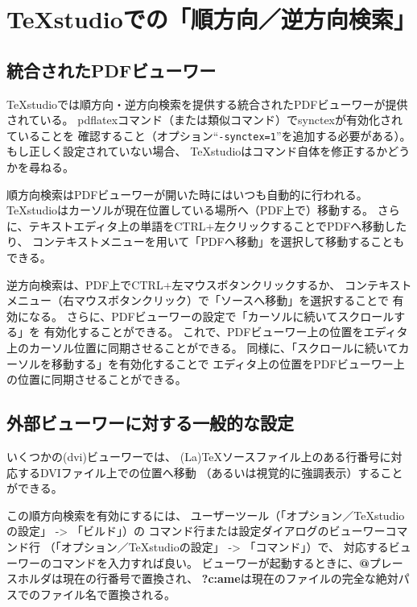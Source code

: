 \section{TeXstudioでの「順方向／逆方向検索」}\label{sec:search}

\subsection{統合されたPDFビューワー}

TeXstudioでは順方向・逆方向検索を提供する統合されたPDFビューワーが提供されている。
pdflatexコマンド（または類似コマンド）でsynctexが有効化されていることを
確認すること（オプション``\texttt{-synctex=1}''を追加する必要がある）。
もし正しく設定されていない場合、
TeXstudioはコマンド自体を修正するかどうかを尋ねる。

順方向検索はPDFビューワーが開いた時にはいつも自動的に行われる。
TeXstudioはカーソルが現在位置している場所へ（PDF上で）移動する。
さらに、テキストエディタ上の単語をCTRL+左クリックすることでPDFへ移動したり、
コンテキストメニューを用いて「PDFへ移動」を選択して移動することもできる。

逆方向検索は、PDF上でCTRL+左マウスボタンクリックするか、
コンテキストメニュー（右マウスボタンクリック）で「ソースへ移動」を選択することで
有効になる。
さらに、PDFビューワーの設定で「カーソルに続いてスクロールする」を
有効化することができる。
これで、PDFビューワー上の位置をエディタ上のカーソル位置に同期させることができる。
同様に、「スクロールに続いてカーソルを移動する」を有効化することで
エディタ上の位置をPDFビューワー上の位置に同期させることができる。

\subsection{外部ビューワーに対する一般的な設定}

いくつかの(dvi)ビューワーでは、
(La)TeXソースファイル上のある行番号に対応するDVIファイル上での位置へ移動
（あるいは視覚的に強調表示）することができる。

この順方向検索を有効にするには、
ユーザーツール（「オプション／TeXstudioの設定」 -\textgreater{} 「ビルド」）の
コマンド行または設定ダイアログのビューワーコマンド行
（「オプション／TeXstudioの設定」 -\textgreater{} 「コマンド」）で、
対応するビューワーのコマンドを入力すれば良い。
ビューワーが起動するときに、\textbf{@}プレースホルダは現在の行番号で置換され、
\textbf{?c:ame}は現在のファイルの完全な絶対パスでのファイル名で置換される。\\


